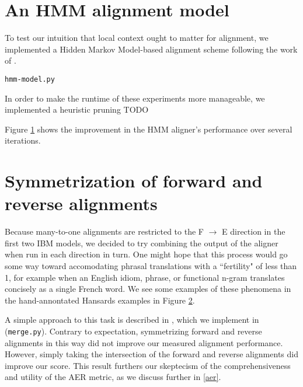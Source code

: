 \documentclass{article}
\begin{document}
\section{An HMM alignment model}

To test our intuition that local context ought to matter for alignment, we implemented a Hidden Markov Model-based alignment scheme following the work of \cite{todo}.

{\tt hmm-model.py}

In order to make the runtime of these experiments more manageable, we implemented a heuristic pruning TODO


Figure \ref{fig:hmm_learning_curve} shows the improvement in the HMM aligner's performance over several iterations.

\begin{figure}
\begin{center}
\end{center}
\label{fig:hmm_learning_curve}
\end{figure}

\section{Symmetrization of forward and reverse alignments}

Because many-to-one alignments are restricted to the F $\rightarrow$ E direction in the first two IBM models, we decided to try combining the output of the aligner when run in each direction in turn. One might hope that this process would go some way toward accomodating phrasal translations with a ``fertility" of less than 1, for example when an English idiom, phrase, or functional n-gram translates concisely as a single French word. We see some examples of these phenomena in the hand-annontated Hansards examples in Figure \ref{fig:etof}.

\begin{figure}
\begin{center}
\end{center}
\label{fig:etof}
\end{figure}

A simple approach to this task is described in \cite{koehn}, which we implement in ({\tt merge.py}). Contrary to expectation, symmetrizing forward and reverse alignments in this way did not improve our measured alignment performance. However, simply taking the intersection of the forward and reverse alignments did improve our score. This result furthers our skeptecism of the comprehensiveness and utility of the AER metric, as we discuss further in \ref{aer}.
\end{document}
